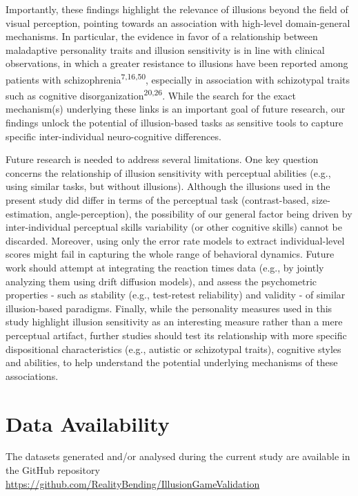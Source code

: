 \documentclass[
  man,floatsintext]{apa6}
\begin{document}
Importantly, these findings highlight the relevance of illusions beyond the field of visual perception, pointing towards an association with high-level domain-general mechanisms. In particular, the evidence in favor of a relationship between maladaptive personality traits and illusion sensitivity is in line with clinical observations, in which a greater resistance to illusions have been reported among patients with schizophrenia\textsuperscript{7,16,50}, especially in association with schizotypal traits such as cognitive disorganization\textsuperscript{20,26}. While the search for the exact mechanism(s) underlying these links is an important goal of future research, our findings unlock the potential of illusion-based tasks as sensitive tools to capture specific inter-individual neuro-cognitive differences.

Future research is needed to address several limitations. One key question concerns the relationship of illusion sensitivity with perceptual abilities (e.g., using similar tasks, but without illusions). Although the illusions used in the present study did differ in terms of the perceptual task (contrast-based, size-estimation, angle-perception), the possibility of our general factor being driven by inter-individual perceptual skills variability (or other cognitive skills) cannot be discarded. Moreover, using only the error rate models to extract individual-level scores might fail in capturing the whole range of behavioral dynamics. Future work should attempt at integrating the reaction times data (e.g., by jointly analyzing them using drift diffusion models), and assess the psychometric properties - such as stability (e.g., test-retest reliability) and validity - of similar illusion-based paradigms. Finally, while the personality measures used in this study highlight illusion sensitivity as an interesting measure rather than a mere perceptual artifact, further studies should test its relationship with more specific dispositional characteristics (e.g., autistic or schizotypal traits), cognitive styles and abilities, to help understand the potential underlying mechanisms of these associations.

\hypertarget{data-availability}{%
\section{Data Availability}\label{data-availability}}

The datasets generated and/or analysed during the current study are available in the GitHub repository \url{https://github.com/RealityBending/IllusionGameValidation}
\end{document}
